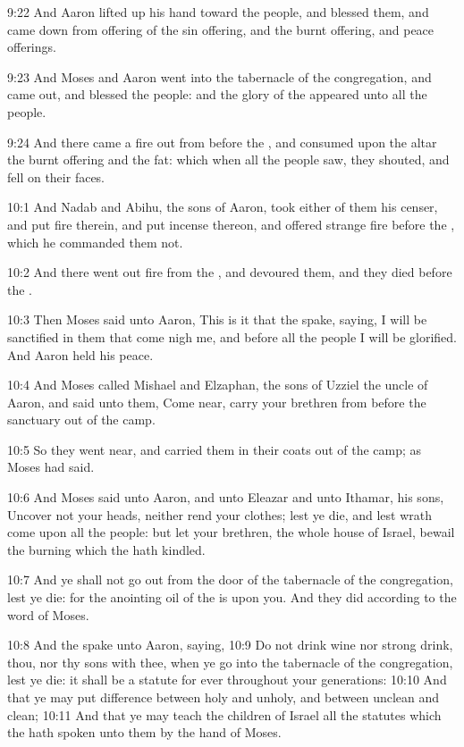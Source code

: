 9:22 And Aaron lifted up his hand toward the people, and blessed them,
and came down from offering of the sin offering, and the burnt
offering, and peace offerings.

9:23 And Moses and Aaron went into the tabernacle of the congregation,
and came out, and blessed the people: and the glory of the \LORD
appeared unto all the people.

9:24 And there came a fire out from before the \LORD, and consumed upon
the altar the burnt offering and the fat: which when all the people
saw, they shouted, and fell on their faces.

10:1 And Nadab and Abihu, the sons of Aaron, took either of them his
censer, and put fire therein, and put incense thereon, and offered
strange fire before the \LORD, which he commanded them not.

10:2 And there went out fire from the \LORD, and devoured them, and
they died before the \LORD.

10:3 Then Moses said unto Aaron, This is it that the \LORD spake,
saying, I will be sanctified in them that come nigh me, and before all
the people I will be glorified. And Aaron held his peace.

10:4 And Moses called Mishael and Elzaphan, the sons of Uzziel the
uncle of Aaron, and said unto them, Come near, carry your brethren
from before the sanctuary out of the camp.

10:5 So they went near, and carried them in their coats out of the
camp; as Moses had said.

10:6 And Moses said unto Aaron, and unto Eleazar and unto Ithamar, his
sons, Uncover not your heads, neither rend your clothes; lest ye die,
and lest wrath come upon all the people: but let your brethren, the
whole house of Israel, bewail the burning which the \LORD hath kindled.

10:7 And ye shall not go out from the door of the tabernacle of the
congregation, lest ye die: for the anointing oil of the \LORD is upon
you. And they did according to the word of Moses.

10:8 And the \LORD spake unto Aaron, saying, 10:9 Do not drink wine nor
strong drink, thou, nor thy sons with thee, when ye go into the
tabernacle of the congregation, lest ye die: it shall be a statute for
ever throughout your generations: 10:10 And that ye may put difference
between holy and unholy, and between unclean and clean; 10:11 And that
ye may teach the children of Israel all the statutes which the \LORD
hath spoken unto them by the hand of Moses.

